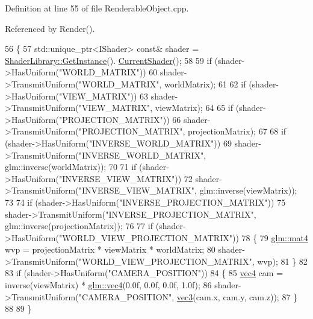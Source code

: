 Definition at line 55 of file Renderable\+Object.\+cpp.



Referenced by Render().


\begin{DoxyCode}
56 \{
57   std::unique\_ptr<IShader> \textcolor{keyword}{const}& shader = \hyperlink{class_singleton_a74f32751d99bf3cc95fe17aba11f4b07}{ShaderLibrary::GetInstance}().
      \hyperlink{struct_shader_library_af15e65d4d0b648272428fc167a6d03b9}{CurrentShader}();
58 
59   \textcolor{keywordflow}{if} (shader->HasUniform(\textcolor{stringliteral}{"WORLD\_MATRIX"}))
60     shader->TransmitUniform(\textcolor{stringliteral}{"WORLD\_MATRIX"}, worldMatrix);
61 
62   \textcolor{keywordflow}{if} (shader->HasUniform(\textcolor{stringliteral}{"VIEW\_MATRIX"}))
63     shader->TransmitUniform(\textcolor{stringliteral}{"VIEW\_MATRIX"}, viewMatrix);
64 
65   \textcolor{keywordflow}{if} (shader->HasUniform(\textcolor{stringliteral}{"PROJECTION\_MATRIX"}))
66     shader->TransmitUniform(\textcolor{stringliteral}{"PROJECTION\_MATRIX"}, projectionMatrix);
67 
68   \textcolor{keywordflow}{if} (shader->HasUniform(\textcolor{stringliteral}{"INVERSE\_WORLD\_MATRIX"}))
69     shader->TransmitUniform(\textcolor{stringliteral}{"INVERSE\_WORLD\_MATRIX"}, glm::inverse(worldMatrix));
70 
71   \textcolor{keywordflow}{if} (shader->HasUniform(\textcolor{stringliteral}{"INVERSE\_VIEW\_MATRIX"}))
72     shader->TransmitUniform(\textcolor{stringliteral}{"INVERSE\_VIEW\_MATRIX"}, glm::inverse(viewMatrix));
73 
74   \textcolor{keywordflow}{if} (shader->HasUniform(\textcolor{stringliteral}{"INVERSE\_PROJECTION\_MATRIX"}))
75     shader->TransmitUniform(\textcolor{stringliteral}{"INVERSE\_PROJECTION\_MATRIX"}, glm::inverse(projectionMatrix));
76 
77   \textcolor{keywordflow}{if} (shader->HasUniform(\textcolor{stringliteral}{"WORLD\_VIEW\_PROJECTION\_MATRIX"}))
78   \{
79     \hyperlink{_types_8h_a2db59f395fe82a7394c6324956c265d8}{glm::mat4} wvp = projectionMatrix * viewMatrix * worldMatrix;
80     shader->TransmitUniform(\textcolor{stringliteral}{"WORLD\_VIEW\_PROJECTION\_MATRIX"}, wvp);
81   \}
82 
83   \textcolor{keywordflow}{if} (shader->HasUniform(\textcolor{stringliteral}{"CAMERA\_POSITION"}))
84   \{
85       \hyperlink{_types_8h_ac54e849f8b2339f592307eaf6cdbba77}{vec4} cam =  inverse(viewMatrix) * \hyperlink{_types_8h_ac54e849f8b2339f592307eaf6cdbba77}{glm::vec4}(0.0f, 0.0f, 0.0f, 1.0f);
86       shader->TransmitUniform(\textcolor{stringliteral}{"CAMERA\_POSITION"}, \hyperlink{_types_8h_a3d0ce73e3199de81565fb01632415288}{vec3}(cam.x, cam.y, cam.z));
87   \}
88 
89 \}
\end{DoxyCode}


